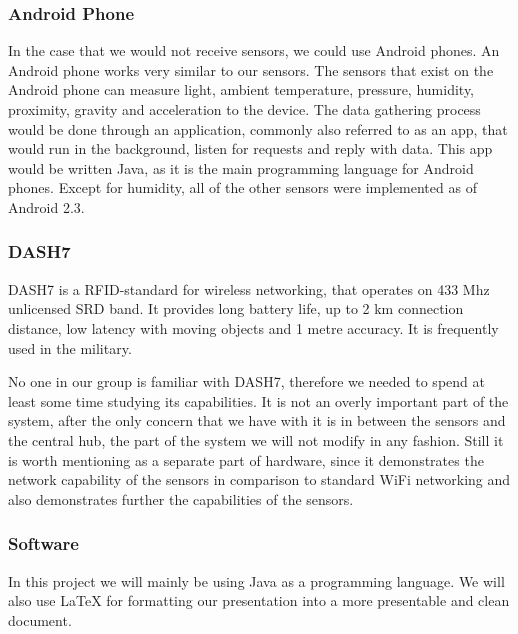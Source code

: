 \documentclass[../document]{subfiles}
\begin{document}
\subsubsection{\gls{Android} Phone}
In the case that we would not receive sensors, we could use \gls{Android} phones. An \gls{Android} phone works very similar to our sensors. The sensors that exist on the \gls{Android} phone can measure light, ambient temperature, pressure, humidity, proximity, gravity and acceleration to the device. The data gathering process would be done through an application, commonly also referred to as an app, that would run in the background, listen for requests and reply with data. This app would be written \gls{Java}, as it is the main programming language for \gls{Android} phones. Except for humidity, all of the other sensors were implemented as of \gls{Android} 2.3.

\subsubsection{\gls{DASH7}}
\gls{DASH7} is a RFID-standard for wireless networking, that operates on 433 Mhz unlicensed SRD band. It provides long battery life, up to 2 km connection distance, low latency with moving objects and 1 metre accuracy. It is frequently used in the military.

No one in our group is familiar with \gls{DASH7}, therefore we needed to spend at least some time studying its capabilities. It is not an overly important part of the system, after the only concern that we have with it is in between the sensors and the central hub, the part of the system we will not modify in any fashion. Still it is worth mentioning as a separate part of hardware, since it demonstrates the network capability of the sensors in comparison to standard WiFi networking and also demonstrates further the capabilities of the sensors.

\subsubsection{Software}
In this project we will mainly be using \gls{Java} as a programming language. We will also use LaTeX for formatting our presentation into a more presentable and clean document.
\end{document}

